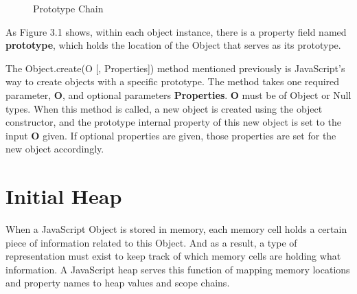 \documentclass[a4paper,11pt,twoside]{report}
\begin{document}
\begin{figure}[!h]
\begin{center}
\caption{Prototype Chain}
\label{fig:initheap}
\end{center}
\end{figure}

As Figure 3.1 shows, within each object instance, there is a property field named \textbf{prototype}, which holds the location of the Object that serves as its prototype.

The Object.create(O [, Properties]) method mentioned previously is JavaScript's way to create objects with a specific prototype. The method takes one required parameter, \textbf{O}, and optional parameters \textbf{Properties}. \textbf{O} must be of Object or Null types. When this method is called, a new object is created using the object constructor, and the prototype internal property of this new object is set to the input \textbf{O} given. If optional properties are given, those properties are set for the new object accordingly.

\section{Initial Heap}
When a JavaScript Object is stored in memory, each memory cell holds a certain piece of information related to this Object. And as a result, a type of representation must exist to keep track of which memory cells are holding what information. A JavaScript heap serves this function of mapping memory locations and property names to heap values and scope chains. %
\end{document}
